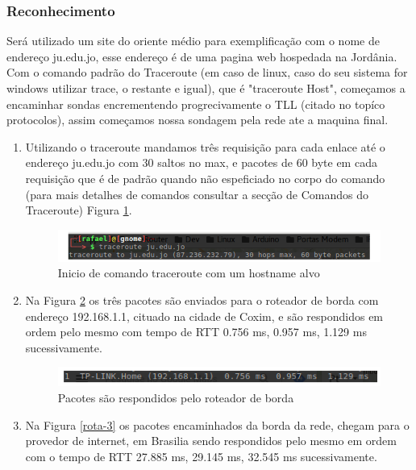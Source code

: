 \documentclass[
	article,			%
	11pt,				%
	oneside,			%
	a4paper,			%
	english,			%
	brazil,				%
	sumario=tradicional
	]{abntex2}
\begin{document}
\subsubsection{Reconhecimento}
 Será utilizado um site do oriente médio para exemplificação com o nome de endereço ju.edu.jo, esse endereço é de uma pagina web hospedada na Jordânia.
 Com o comando padrão do Traceroute (em caso de linux, caso do seu sistema for windows utilizar trace, o restante e igual), que é "traceroute Host", começamos a encaminhar sondas encrementendo progrecivamente o TLL (citado no topíco protocolos), assim começamos nossa sondagem pela rede ate a maquina final. 
 \begin{enumerate}
 	\item
 	Utilizando o traceroute mandamos três requisição para cada enlace até o endereço ju.edu.jo com 30 saltos no max, e pacotes de 60 byte em cada requisição que é de padrão quando não espeficiado no corpo do comando (para mais detalhes de comandos consultar a secção de Comandos do Traceroute) Figura \ref{rota-1}.
 		\begin{figure}[H]
	 		\centering
	 		\includegraphics[scale=0.65]{./rota-1.png}
	 		\caption{Inicio de comando traceroute com um hostname alvo}
	 		\label{rota-1}
	 	\end{figure}
 	
 	\item
 	Na Figura \ref{rota-2} os três pacotes são enviados para o roteador de borda com endereço 192.168.1.1, cituado na cidade de Coxim, e são respondidos em ordem pelo mesmo com tempo de RTT 0.756 ms, 0.957 ms, 1.129 ms sucessivamente.
 	\begin{figure}[H]
 		\centering
 		\includegraphics[scale=0.7]{./rota-2.png}
 		\caption{Pacotes são respondidos pelo roteador de borda}
 		\label{rota-2}
 	\end{figure}
 	
 	\item
 	Na Figura \ref{rota-3} os pacotes encaminhados da borda da rede, chegam para o provedor de internet, em Brasilia sendo respondidos pelo mesmo em ordem com o tempo de RTT 27.885 ms, 29.145 ms, 32.545 ms sucessivamente.	
 	

\end{enumerate}
\end{document}
